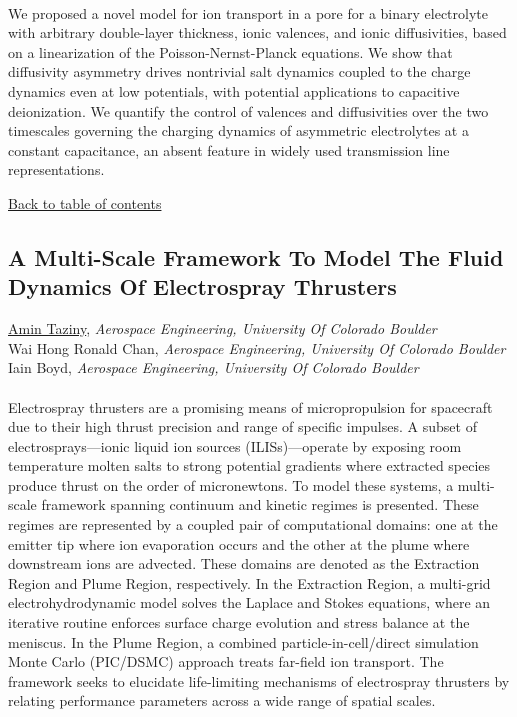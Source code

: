 \noindent  \\ 
\noindent We proposed a novel model for ion transport in a pore for a binary electrolyte with arbitrary double-layer thickness, ionic valences, and ionic diffusivities, based on a linearization of the Poisson-Nernst-Planck equations. We show that diffusivity asymmetry drives nontrivial salt dynamics coupled to the charge dynamics even at low potentials, with potential applications to capacitive deionization. We quantify the control of valences and diffusivities over the two timescales governing the charging dynamics of asymmetric electrolytes at a constant capacitance, an absent feature in widely used transmission line representations. \\ 
\begin{flushright}\vspace{-0.2 in}\hyperlink{toc}{Back to table of contents}\end{flushright}\vspace{-0.2 in}
\hypertarget{AminTaziny}{\subsection*{\color{CUGOLD} A Multi-Scale Framework To Model The Fluid Dynamics Of Electrospray Thrusters}} \vsp 
\underline{Amin Taziny}, \textit{Aerospace Engineering, University Of Colorado Boulder}\\ 
{Wai Hong Ronald Chan}, \textit{Aerospace Engineering, University Of Colorado Boulder}\\ 
{Iain Boyd}, \textit{Aerospace Engineering, University Of Colorado Boulder}\\ 
\vspace{-0.1 in} \\ 
\noindent Electrospray thrusters are a promising means of micropropulsion for spacecraft due to their high thrust precision and range of specific impulses. A subset of electrosprays---ionic liquid ion sources (ILISs)---operate by exposing room temperature molten salts to strong potential gradients where extracted species produce thrust on the order of micronewtons. To model these systems, a multi-scale framework spanning continuum and kinetic regimes is presented. These regimes are represented by a coupled pair of computational domains: one at the emitter tip where ion evaporation occurs and the other at the plume where downstream ions are advected. These domains are denoted as the Extraction Region and Plume Region, respectively. In the Extraction Region, a multi-grid electrohydrodynamic model solves the Laplace and Stokes equations, where an iterative routine enforces surface charge evolution and stress balance at the meniscus. In the Plume Region, a combined particle-in-cell/direct simulation Monte Carlo (PIC/DSMC) approach treats far-field ion transport. The framework seeks to elucidate life-limiting mechanisms of electrospray thrusters by relating performance parameters across a wide range of spatial scales.     \\ 
